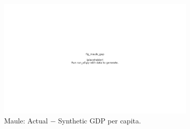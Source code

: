 \begin{figure}[H]
\centering
\includegraphics[width=0.85\textwidth]{figures/fig_maule_gap.pdf}
\caption{Maule: Actual $-$ Synthetic GDP per capita.}
\label{fig:maule_gap}
\end{figure}
